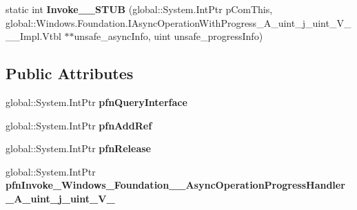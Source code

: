 \begin{DoxyCompactItemize}
\item 
\mbox{\label{struct_windows_1_1_foundation_1_1_async_operation_progress_handler___a__uint__j__uint___v_______impl_1_1_vtbl_a0e7f4faddca6cbaa7ea1a6f5cba3c932}} 
static int {\bfseries Invoke\+\_\+\+\_\+\+S\+T\+UB} (global\+::\+System.\+Int\+Ptr p\+Com\+This, global\+::\+Windows.\+Foundation.\+I\+Async\+Operation\+With\+Progress\+\_\+\+A\+\_\+uint\+\_\+j\+\_\+uint\+\_\+\+V\+\_\+\+\_\+\+\_\+\+Impl.\+Vtbl $\ast$$\ast$unsafe\+\_\+async\+Info, uint unsafe\+\_\+progress\+Info)
\end{DoxyCompactItemize}
\subsection*{Public Attributes}
\begin{DoxyCompactItemize}
\item 
\mbox{\label{struct_windows_1_1_foundation_1_1_async_operation_progress_handler___a__uint__j__uint___v_______impl_1_1_vtbl_a7e3f37c2c4fef91dd2718d2d003e6470}} 
global\+::\+System.\+Int\+Ptr {\bfseries pfn\+Query\+Interface}
\item 
\mbox{\label{struct_windows_1_1_foundation_1_1_async_operation_progress_handler___a__uint__j__uint___v_______impl_1_1_vtbl_afd935a914996bd113d498174edb36eec}} 
global\+::\+System.\+Int\+Ptr {\bfseries pfn\+Add\+Ref}
\item 
\mbox{\label{struct_windows_1_1_foundation_1_1_async_operation_progress_handler___a__uint__j__uint___v_______impl_1_1_vtbl_a004935c4cd652fa55c784dfae726eea7}} 
global\+::\+System.\+Int\+Ptr {\bfseries pfn\+Release}
\item 
\mbox{\label{struct_windows_1_1_foundation_1_1_async_operation_progress_handler___a__uint__j__uint___v_______impl_1_1_vtbl_a6e4ecb6dbc4bdca7f876d857f0f3b79e}} 
global\+::\+System.\+Int\+Ptr {\bfseries pfn\+Invoke\+\_\+\+Windows\+\_\+\+Foundation\+\_\+\+\_\+\+Async\+Operation\+Progress\+Handler\+\_\+\+A\+\_\+uint\+\_\+j\+\_\+uint\+\_\+\+V\+\_\+}
\end{DoxyCompactItemize}

